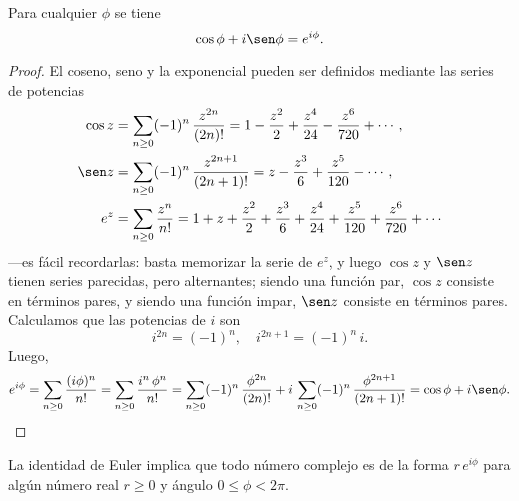 \begin{proposicion}
  Para cualquier $\phi$ se tiene
  $$\cos\phi + i\sen\phi = e^{i\phi}.$$

  \begin{proof}
    El coseno, seno y la exponencial pueden ser definidos mediante las series de
    potencias
    \begin{align*}
      \cos z & = \sum_{n\ge 0} (-1)^n\,\frac{z^{2n}}{(2n)!} = 1 - \frac{z^2}{2} + \frac{z^4}{24} - \frac{z^6}{720} + \cdots,\\
      \sen z & = \sum_{n\ge 0} (-1)^n\,\frac{z^{2n+1}}{(2n+1)!} = z - \frac{z^3}{6} + \frac{z^5}{120} - \cdots,\\
      e^z & = \sum_{n\ge 0} \frac{z^n}{n!} = 1 + z + \frac{z^2}{2} + \frac{z^3}{6} + \frac{z^4}{24} + \frac{z^5}{120} + \frac{z^6}{720} + \cdots
    \end{align*}
    ---es fácil recordarlas: basta memorizar la serie de $e^z$, y luego $\cos z$
    y $\sen z$ tienen series parecidas, pero alternantes; siendo una función
    par, $\cos z$ consiste en términos pares, y siendo una función impar,
    $\sen z$ consiste en términos pares. Calculamos que las potencias de $i$ son
    $$i^{2n} = (-1)^n, \quad i^{2n+1} = (-1)^n\,i.$$
    Luego,
    \[ e^{i\phi} =
      \sum_{n\ge 0} \frac{(i\phi)^n}{n!} =
      \sum_{n\ge 0} \frac{i^n\,\phi^n}{n!} =
      \sum_{n\ge 0} (-1)^n\,\frac{\phi^{2n}}{(2n)!} + i\,\sum_{n\ge 0} (-1)^n\,\frac{\phi^{2n+1}}{(2n+1)!} =
      \cos \phi + i\sen \phi. \qedhere \]
  \end{proof}
\end{proposicion}

La identidad de Euler implica que todo número complejo es de la forma
$r\,e^{i\phi}$ para algún número real $r \ge 0$ y ángulo $0 \le \phi < 2\pi$.

